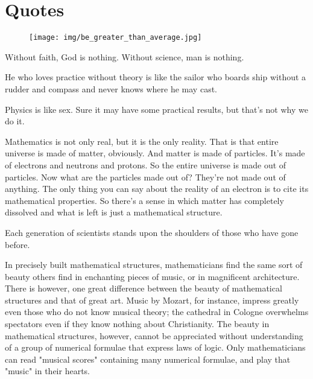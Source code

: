 \documentclass[12pt,a4paper,twoside,openright]{report}
\theoremstyle{definition}
\theoremstyle{itexmp}
\numberwithin{equation}{section}
\begin{document}
			
	\chapter{Quotes}
	\begin{figure}[H]
		\centering
		\texttt{[image: img/be\_greater\_than\_average.jpg]}	
	\end{figure}
	\begin{fquote}Without faith, God is nothing. Without science, man is nothing.
 	\end{fquote}
 	
	\begin{fquote}He who loves practice without theory is like the sailor who boards ship without a rudder and compass and never knows where he may cast.
 	\end{fquote}
 	
	\begin{fquote}Physics is like sex. Sure it may have some practical results, but that's not why we do it.
 	\end{fquote}
 	
	\begin{fquote}Mathematics is not only real, but it is the only reality. That is that entire universe is made of matter, obviously. And matter is made of particles. It's made of electrons and neutrons and protons. So the entire universe is made out of particles. Now what are the particles made out of? They're not made out of anything. The only thing you can say about the reality of an electron is to cite its mathematical properties. So there's a sense in which matter has completely dissolved and what is left is just a mathematical structure.
 	\end{fquote}
 	
 	\begin{fquote}Each generation of scientists stands upon the shoulders of those who have gone before.
 	\end{fquote}
 	
 	\begin{fquote}In precisely built mathematical structures, mathematicians find the same sort of beauty others find in enchanting pieces of music, or in magnificent architecture. There is however, one great difference between the beauty of mathematical structures and that of great art. Music by Mozart, for instance, impress greatly even those who do not know musical theory; the cathedral in Cologne overwhelms spectators even if they know nothing about Christianity. The beauty in mathematical structures, however, cannot be appreciated without understanding of a group of numerical formulae that express laws of logic. Only mathematicians can read "musical scores" containing many numerical formulae, and play that "music" in their hearts.
 	\end{fquote}
 	
\end{document}
